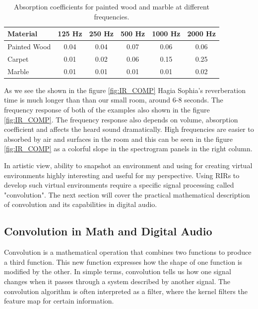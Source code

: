             \begin{table}[h!]
                \centering
                \begin{tabular}{|l|c|c|c|c|c|}
                \hline
                Material & 125 Hz & 250 Hz & 500 Hz & 1000 Hz & 2000 Hz \\
                \hline
                Painted Wood & 0.04 & 0.04 & 0.07 & 0.06 & 0.06 \\
                Carpet       & 0.01 & 0.02 & 0.06 & 0.15 & 0.25 \\
                Marble       & 0.01 & 0.01 & 0.01 & 0.01 & 0.02 \\
                \hline
                \end{tabular}
                \caption{Absorption coefficients for painted wood and marble at different frequencies\cite{Absoption_Coefficient_Table}.}
                \label{tab:COEFF}
            \end{table}

            As we see the shown in the figure \ref{fig:IR_COMP} Hagia Sophia's reverberation time is much longer than than our small room, around 6-8 seconds. The frequency response of both of the examples also shown in the figure \ref{fig:IR_COMP}. The frequency response also depends on volume, absorption coefficient and affects the heard sound dramatically. High frequencies are easier to absorbed by air and surfaces\cite{Room_Acoustics} in the room and this can be seen in the figure \ref{fig:IR_COMP} as a colorful slope in the spectrogram panels in the right column.\par

            In artistic view, ability to snapshot an environment and using for creating virtual environments\cite{Recreation_of_the_Acoustics_of_Hagia_Sophia} highly interesting and useful for my perspective. Using RIRs to develop such virtual environments require a specific signal processing called "convolution". The next section will cover the practical mathematical description of convolution and its capabilities in digital audio.            
        \subsection{Convolution in Math and Digital Audio}
            Convolution is a mathematical operation that combines two functions to produce a third function. This new function expresses how the shape of one function is modified by the other. In simple terms, convolution tells us how one signal changes when it passes through a system described by another signal. The convolution algorithm is often interpreted as a filter, where the kernel filters the feature map for certain information\cite{Deep_Learning_Core_Concepts}.\par

